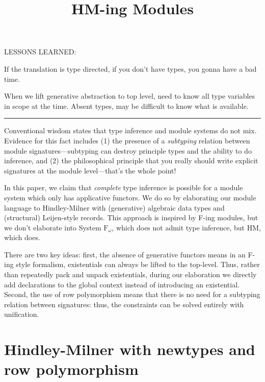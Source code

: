 \documentclass{article}
\begin{document}
\setlength{\pdfpageheight}{\paperheight}
\setlength{\pdfpagewidth}{\paperwidth}

\title{HM-ing Modules}

\maketitle

\noindent
LESSONS LEARNED\@:

If the translation is type directed, if you don't have types, you gonna
have a bad time.

When we lift generative abstraction to top level, need to know all
type variables in scope at the time.  Absent types, may be difficult
to know what is available.

\vspace{1em}
\hrule{}
\vspace{1em}


Conventional wisdom states that type inference and module systems do not
mix.  Evidence for this fact includes (1) the presence of a
\emph{subtyping} relation between module signatures---subtyping can
destroy principle types and the ability to do inference, and (2) the
philosophical principle that you really should write explicit signatures
at the module level---that's the whole point!

In this paper, we claim that \emph{complete} type inference is possible
for a module system which only has applicative functors.  We do so by
elaborating our module language to Hindley-Milner with (generative)
algebraic data types and (structural) Leijen-style records.  This
approach is inspired by F-ing modules, but we don't elaborate into
System $\mathrm{F}_\omega$, which does not admit type inference, but HM,
which does.

There are two key ideas: first, the absence of generative functors means
in an F-ing style formalism, existentials can always be lifted to
the top-level.  Thus, rather than repeatedly pack and unpack existentials,
during our elaboration we directly add declarations to the global context
instead of introducing an existential.  Second, the use of row polymorphism
means that there is no need for a subtyping relation between signatures:
thus, the constraints can be solved entirely with unification.

\section{Hindley-Milner with newtypes and row polymorphism}
\end{document}
